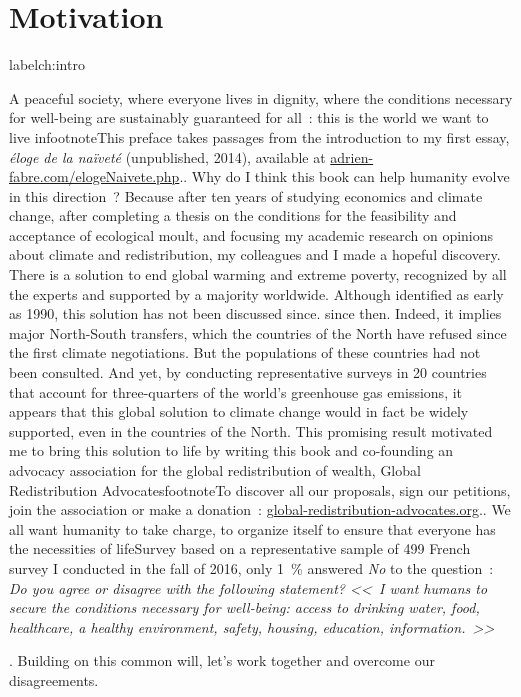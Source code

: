 \documentclass[a5paper,french,openany]{memoir}
\begin{document}
\chapter*{Motivation}{label{ch:intro}


A peaceful society, where everyone lives in dignity, where the conditions necessary for well-being are sustainably guaranteed for all~: this is the world we want to live infootnote{This preface takes passages from the introduction to my first essay, \textit{éloge de la naïveté} (unpublished, 2014), available at \href{https://adrien-fabre.com/elogeNaivete.php}{adrien-fabre.com/elogeNaivete.php}.}. Why do I think this book can help humanity evolve in this direction~? Because after ten years of studying economics and climate change, after completing a thesis on the conditions for the feasibility and acceptance of ecological moult, and focusing my academic research on opinions about climate and redistribution, my colleagues and I made a hopeful discovery. %
There is a solution to end global warming and extreme poverty, recognized by %
all the experts and supported by a majority worldwide. 
Although identified as early as 1990, this solution has not been discussed since.
since then. Indeed, it implies major North-South transfers, which the countries of the North have refused since the first climate negotiations. But the populations of these countries had not been consulted. And yet, by conducting representative surveys in 20 countries that account for three-quarters of the world's greenhouse gas emissions, it appears that this global solution to climate change would in fact be widely supported, even in the countries of the North. 
This promising result motivated me to bring this solution to life by writing this book and co-founding an advocacy association for the global redistribution of wealth, Global Redistribution Advocatesfootnote{To discover all our proposals, sign our petitions, join the association or make a donation~: \href{http://global-redistribution-advocates.org/}{global-redistribution-advocates.org}.}. %
We all want humanity to take charge, to organize itself 
to ensure that everyone has the necessities of lifeSurvey based on a representative sample of 499%
French survey I conducted in the fall of 2016, only 1~\% answered \textit{No} to the question~: \textit{Do you agree or disagree with the following statement? <<~I want humans to secure the conditions necessary for well-being: access to drinking water, food, healthcare, a healthy environment, safety, housing, education, information.~>>}}. 
Building on this common will, let's work together and overcome our disagreements.
\end{document}
